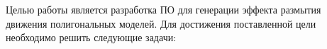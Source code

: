Целью работы является разработка ПО для генерации эффекта размытия движения полигональных моделей. Для достижения поставленной цели необходимо решить следующие задачи:

